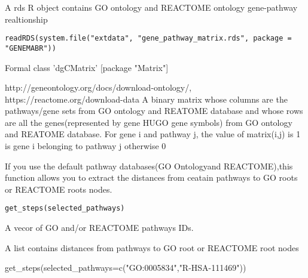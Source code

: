\documentclass[a4paper]{book}
\begin{document}
%
\begin{Description}\relax
A rds R object contains GO ontology and REACTOME ontology gene-pathway realtionship
\end{Description}
%
\begin{Usage}
\begin{verbatim}
readRDS(system.file("extdata", "gene_pathway_matrix.rds", package = "GENEMABR"))
\end{verbatim}
\end{Usage}
%
\begin{Format}
Formal class 'dgCMatrix' [package "Matrix"]
\end{Format}
%
\begin{Source}\relax
http://geneontology.org/docs/download-ontology/, https://reactome.org/download-data
A binary matrix whose columns are the pathways/gene sets from GO ontology and REATOME database and 
whose rows are all the genes(represented by gene HUGO gene symbols) from  GO ontology and REATOME database.
For gene i and pathway j, the value of matrix(i,j) is 1 is gene i belonging to pathway j otherwise 0
\end{Source}
%
\begin{Description}\relax
If you use the default pathway databases(GO Ontologyand REACTOME),this function allows you to extract  the distances from ceatain pathways to  GO roots or REACTOME roots nodes.
\end{Description}
%
\begin{Usage}
\begin{verbatim}
get_steps(selected_pathways)
\end{verbatim}
\end{Usage}
%
\begin{Arguments}
\begin{ldescription}
\item[\code{selected\_pathways}] A vecor of GO and/or REACTOME pathways IDs.
\end{ldescription}
\end{Arguments}
%
\begin{Value}
A list contains distances from pathways to GO root or REACTOME root nodes
\end{Value}
%
\begin{Examples}
\begin{ExampleCode}
get_steps(selected_pathways=c("GO:0005834","R-HSA-111469"))
\end{ExampleCode}
\end{Examples}
\end{document}
